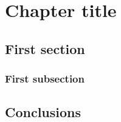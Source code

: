 
\chapter{Chapter title}\label{ch:name}

\chapterprecishere{
}
\chapterprecistoc{} %



\section{First section}\label{sec:name-first}


\subsection{First subsection}\label{sec:name-first-sub}

\section{Conclusions}\label{sec:name-conclusions}
